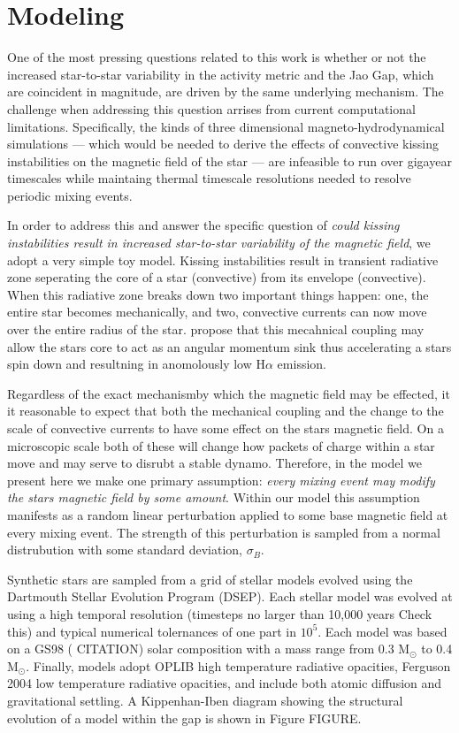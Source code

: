 \section{Modeling}\label{sec:modeling}
One of the most pressing questions related to this work is whether or not the
increased star-to-star variability in the activity metric and the Jao Gap,
which are coincident in magnitude, are driven by the same underlying mechanism.
The challenge when addressing this question arrises from current computational
limitations. Specifically, the kinds of three dimensional
magneto-hydrodynamical simulations --- which would be needed to derive the
effects of convective kissing instabilities on the magnetic field of the star
--- are infeasible to run over gigayear timescales while maintaing thermal
timescale resolutions needed to resolve periodic mixing events.

In order to address this and answer the specific question of \textit{could
kissing instabilities result in increased star-to-star variability of the
magnetic field}, we adopt a very simple toy model. Kissing instabilities result
in transient radiative zone seperating the core of a star (convective) from its
envelope (convective). When this radiative zone breaks down two important
things happen: one, the entire star becomes mechanically, and two, convective
currents can now move over the entire radius of the star. \citet{Jao2023}
propose that this mecahnical coupling may allow the stars core to act as an
angular momentum sink thus accelerating a stars spin down and resultning in
anomolously low H$\alpha$ emission. 

Regardless of the exact mechanismby which the magnetic field may be effected,
it it reasonable to expect that both the mechanical coupling and the change to
the scale of convective currents to have some effect on the stars magnetic
field. On a microscopic scale both of these will change how packets of charge
within a star move and may serve to disrubt a stable dynamo. Therefore, in the
model we present here we make one primary assumption: \textit{every mixing
event may modify the stars magnetic field by some amount}. Within our model
this assumption manifests as a random linear perturbation applied to some base
magnetic field at every mixing event. The strength of this perturbation is 
sampled from a normal distrubution with some standard deviation, $\sigma_{B}$.

Synthetic stars are sampled from a grid of stellar models evolved using the
Dartmouth Stellar Evolution Program (DSEP). Each stellar model was evolved at
using a high temporal resolution (timesteps no larger than 10,000 years
{\color{red} Check this}) and typical numerical tolernances of one part in
$10^5$. Each model was based on a GS98 ({\color{red} CITATION}) solar
composition with a mass range from 0.3 M$_{\odot}$ to 0.4 M$_{\odot}$. Finally,
models adopt OPLIB high temperature radiative opacities, Ferguson 2004 low
temperature radiative opacities, and include both atomic diffusion and
gravitational settling. A Kippenhan-Iben diagram showing the structural
evolution of a model within the gap is shown in Figure {\color{red} FIGURE}.

